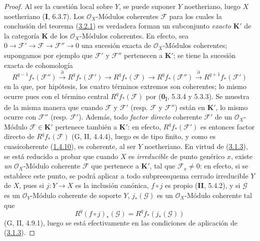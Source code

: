 \begin{proof}
Al ser la cuestión local sobre $Y$, se puede suponer $Y$ noetheriano, luego $X$
noetheriano (\textbf{I}, 6.3.7). Los $\mathcal O_X$-Módulos coherentes $\mathcal F$ para
los cuales la conclusión del teorema (\hyperref[III.3.2.1-fr]{3.2.1}) es verdadera
forman un subconjunto \emph{exacto} $\boldsymbol{K}'$ de la categoría $\boldsymbol{K}$ de los
$\mathcal O_X$-Módulos coherentes.
En efecto, sea
$0\to\mathcal F'\to\mathcal F\to\mathcal F''\to0$ una sucesión exacta de
$\mathcal O_X$-Módulos coherentes; supongamos por ejemplo que $\mathcal F'$
y $\mathcal F''$ pertenecen a $\boldsymbol{K}'$; se tiene la sucesión exacta de cohomología
\[
R^{q-1}f_*(\mathcal F'')\xrightarrow{\partial}R^qf_*(\mathcal F')
\longrightarrow R^qf_*(\mathcal F)\longrightarrow R^qf_*(\mathcal F'')
\xrightarrow{\partial}R^{q+1}f_*(\mathcal F')
\]
en la que, por hipótesis, los cuatro términos extremos son coherentes;
lo mismo ocurre pues con el término central $R^qf_*(\mathcal F)$ por
(\textbf{0}\textsubscript{I}, 5.3.4 y 5.3.3). Se muestra de la misma manera que
cuando $\mathcal F$ y $\mathcal F'$ (resp. $\mathcal F$ y
$\mathcal F''$) están en $\boldsymbol{K}'$, lo mismo ocurre con $\mathcal F''$ (resp.
$\mathcal F'$). Además, todo \emph{factor directo} coherente $\mathcal F'$
de un $\mathcal O_X$-Módulo $\mathcal F\in\boldsymbol{K}'$ pertenece también a $\boldsymbol{K}'$: en
efecto, $R^qf_*(\mathcal F')$ es entonces factor directo de
$R^qf_*(\mathcal F)$ (G, II, 4.4.4), luego es de tipo finito, y como es
cuasicoherente (\hyperref[III.1.4.10-fr]{1.4.10}), es coherente, al ser $Y$
noetheriano. En virtud de (\hyperref[III.3.1.3-fr]{3.1.3}), se está
reducido a probar que cuando $X$ es \emph{irreducible} de punto genérico
$x$, existe \emph{un} $\mathcal O_X$-Módulo coherente $\mathcal F$ que pertenece a
$\boldsymbol{K}'$, tal que $\mathcal F_x\neq0$: en efecto, si se establece este punto, se
podrá aplicar a todo subpreesquema cerrado irreducible $Y$ de $X$, pues
si $j:Y\to X$ es la inclusión canónica, $f\circ j$ es propio (\textbf{II}, 5.4.2),
y si $\mathcal G$ es un $\mathcal O_Y$-Módulo coherente de soporte $Y$,
$j_*(\mathcal G)$ es un $\mathcal O_X$-Módulo coherente tal que
\[
R^q(f\circ j)_*(\mathcal G)=R^qf_*(j_*(\mathcal G))
\]
(G, II, 4.9.1), luego se está efectivamente en las condiciones de aplicación de
(\hyperref[III.3.1.3-fr]{3.1.3}).


\end{proof}

